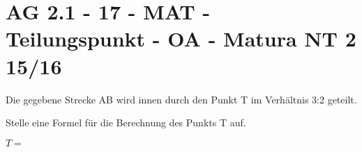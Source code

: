 \section{AG 2.1 - 17 - MAT - Teilungspunkt - OA - Matura NT 2 15/16}

\begin{beispiel}[AG 2.1]{1} %
Die gegebene Strecke AB wird innen durch den Punkt T im Verhältnis 3:2 geteilt.

Stelle eine Formel für die Berechnung des Punkts T auf.

$T=$ 
\end{beispiel}
